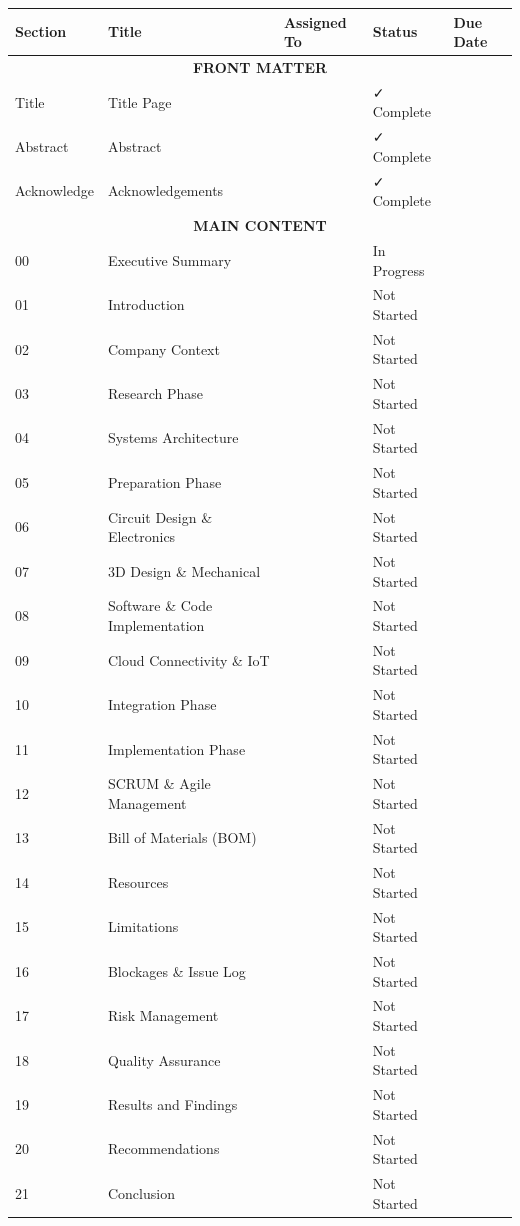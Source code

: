 \documentclass[12pt]{article}
\begin{document}
\begin{tabular}{|p{2.5cm}|p{5cm}|p{2.5cm}|p{2.5cm}|p{2.5cm}|}
\hline
\cellcolor{lightblue}\textbf{Section} & 
\cellcolor{lightblue}\textbf{Title} & 
\cellcolor{lightblue}\textbf{Assigned To} & 
\cellcolor{lightblue}\textbf{Status} & 
\cellcolor{lightblue}\textbf{Due Date} \\
\hline

\multicolumn{5}{|c|}{\cellcolor{gray!30}\textbf{FRONT MATTER}} \\
\hline
Title & Title Page & & ✓ Complete & \\
Abstract & Abstract & & ✓ Complete & \\
Acknowledge & Acknowledgements & & ✓ Complete & \\

\hline
\multicolumn{5}{|c|}{\cellcolor{gray!30}\textbf{MAIN CONTENT}} \\
\hline

00 & Executive Summary & & \cellcolor{yellow}In Progress & \\
01 & Introduction & & \cellcolor{orange}Not Started & \\
02 & Company Context & & \cellcolor{orange}Not Started & \\
03 & Research Phase & & \cellcolor{orange}Not Started & \\
04 & Systems Architecture & & \cellcolor{orange}Not Started & \\
05 & Preparation Phase & & \cellcolor{orange}Not Started & \\
06 & Circuit Design \& Electronics & & \cellcolor{orange}Not Started & \\
07 & 3D Design \& Mechanical & & \cellcolor{orange}Not Started & \\
08 & Software \& Code Implementation & & \cellcolor{orange}Not Started & \\
09 & Cloud Connectivity \& IoT & & \cellcolor{orange}Not Started & \\
10 & Integration Phase & & \cellcolor{orange}Not Started & \\
11 & Implementation Phase & & \cellcolor{orange}Not Started & \\
12 & SCRUM \& Agile Management & & \cellcolor{orange}Not Started & \\
13 & Bill of Materials (BOM) & & \cellcolor{orange}Not Started & \\
14 & Resources & & \cellcolor{orange}Not Started & \\
15 & Limitations & & \cellcolor{orange}Not Started & \\
16 & Blockages \& Issue Log & & \cellcolor{orange}Not Started & \\
17 & Risk Management & & \cellcolor{orange}Not Started & \\
18 & Quality Assurance & & \cellcolor{orange}Not Started & \\
19 & Results and Findings & & \cellcolor{orange}Not Started & \\
20 & Recommendations & & \cellcolor{orange}Not Started & \\
21 & Conclusion & & \cellcolor{orange}Not Started & \\


\end{tabular}
\end{document}
